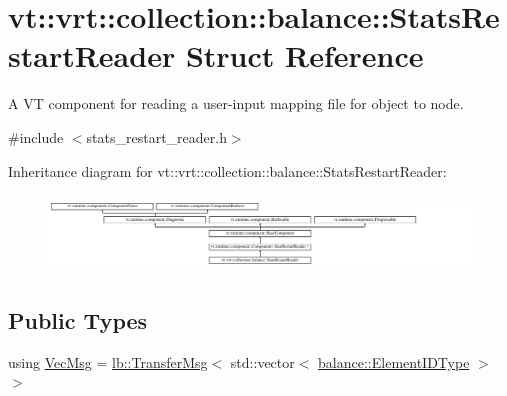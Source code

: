 \hypertarget{structvt_1_1vrt_1_1collection_1_1balance_1_1_stats_restart_reader}{}\section{vt\+:\+:vrt\+:\+:collection\+:\+:balance\+:\+:Stats\+Restart\+Reader Struct Reference}
\label{structvt_1_1vrt_1_1collection_1_1balance_1_1_stats_restart_reader}


A VT component for reading a user-\/input mapping file for object to node.  




{\ttfamily \#include $<$stats\+\_\+restart\+\_\+reader.\+h$>$}

Inheritance diagram for vt\+:\+:vrt\+:\+:collection\+:\+:balance\+:\+:Stats\+Restart\+Reader\+:\begin{figure}[H]
\begin{center}
\leavevmode
\includegraphics[height=2.034884cm]{structvt_1_1vrt_1_1collection_1_1balance_1_1_stats_restart_reader}
\end{center}
\end{figure}
\subsection*{Public Types}
\begin{DoxyCompactItemize}
\item 
using \hyperlink{structvt_1_1vrt_1_1collection_1_1balance_1_1_stats_restart_reader_a7e2a74977e595242bf3abb6c83b7e27b}{Vec\+Msg} = \hyperlink{structvt_1_1vrt_1_1collection_1_1lb_1_1_transfer_msg}{lb\+::\+Transfer\+Msg}$<$ std\+::vector$<$ \hyperlink{namespacevt_1_1vrt_1_1collection_1_1balance_a592736f733df4f90856df90a1fd08905}{balance\+::\+Element\+I\+D\+Type} $>$ $>$
\end{DoxyCompactItemize}
